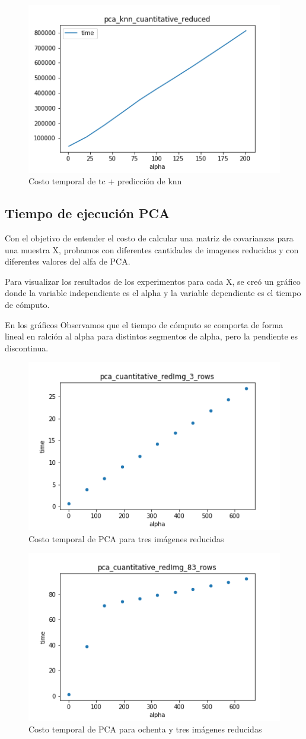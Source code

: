 \begin{figure}[H]
	\begin{center}
      \includegraphics[width=0.4\columnwidth]{imagenes/charuli-des/pca_knn_cuantitative_reduced.png}
      \caption{Costo temporal de tc + predicción de knn}
      \end{center}
\end{figure}

\subsection{Tiempo de ejecución PCA}

Con el objetivo de entender el costo de calcular una matriz de covarianzas para una muestra X, probamos con diferentes cantidades de imagenes reducidas y con diferentes valores del alfa de PCA. 

Para visualizar los resultados de los experimentos para cada X, se creó un gráfico donde la variable independiente es el alpha y la variable dependiente es el tiempo de cómputo. 

En los gráficos Observamos que el tiempo de cómputo se comporta de forma lineal en ralción al alpha para distintos segmentos de alpha, pero la pendiente es discontinua.

\begin{figure}[H]
	\begin{center}
      \includegraphics[width=0.4\columnwidth]{imagenes/charuli-des/pca_cuantitative_redImg_3_rows.png}
      \caption{Costo temporal de PCA para tres imágenes reducidas}
      \end{center}
\end{figure}
\begin{figure}
	\begin{center}
    	\includegraphics[width=0.4\columnwidth]{imagenes/charuli-des/pca_cuantitative_redImg_83_rows.png}
     \caption{Costo temporal de PCA para ochenta y tres imágenes reducidas}
     \end{center}
\end{figure}

